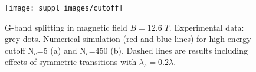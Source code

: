 \documentclass[pra,aps,superscriptaddress,preprint]{revtex4-1}
\begin{document}
\begin{figure}[h!]
   \texttt{[image: suppl\_images/cutoff]}
   \caption{\label{cutoff}G-band splitting in magnetic field $B=12.6 \; T$. Experimental data: grey dots. Numerical simulation (red and blue lines) for high energy cutoff N$_c$=5 (a) and N$_c$=450 (b). Dashed lines are results including effects of symmetric transitions with $\lambda_s=0.2\lambda$.}
\end{figure}



 


%
%

%



\end{document}
